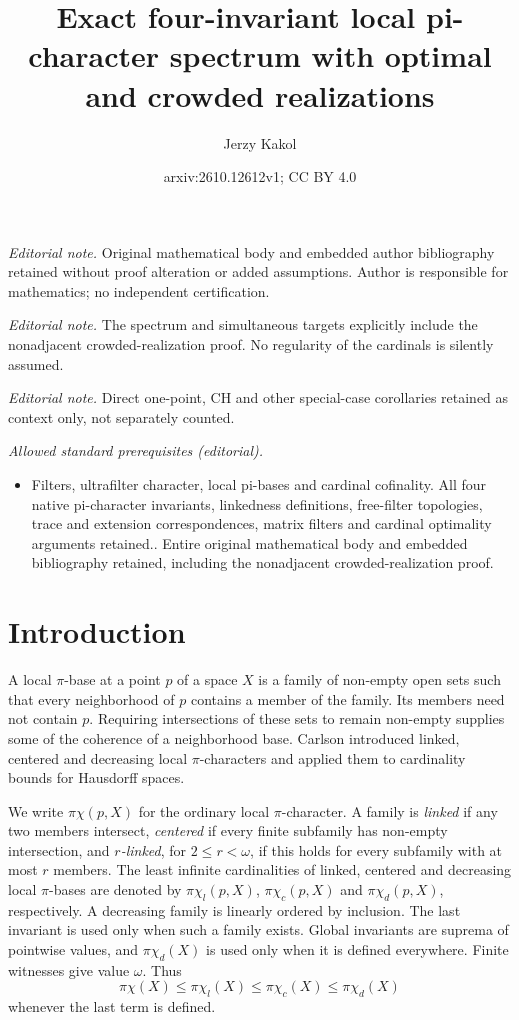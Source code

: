 \documentclass[10pt,a4paper]{amsart}
\title{Exact four-invariant local pi-character spectrum with optimal and crowded realizations}
\author{Jerzy Kakol}
\date{arxiv:2610.12612v1; CC BY 4.0}
\theoremstyle{definition}
\theoremstyle{remark}
\newcommand{\pc}{\pi\chi}
\newcommand{\pcl}{\pi\chi_l}
\newcommand{\pcc}{\pi\chi_c}
\newcommand{\pcd}{\pi\chi_d}
\begin{document}
\maketitle
\noindent\textit{Editorial note.} Original mathematical body and embedded author bibliography retained without proof alteration or added assumptions. Author is responsible for mathematics; no independent certification.\par\medskip
\noindent\textit{Editorial note.} The spectrum and simultaneous targets explicitly include the nonadjacent crowded-realization proof. No regularity of the cardinals is silently assumed.\par\medskip
\noindent\textit{Editorial note.} Direct one-point, CH and other special-case corollaries retained as context only, not separately counted.\par\medskip
\noindent\textit{Allowed standard prerequisites (editorial).}\begin{itemize}
\item Filters, ultrafilter character, local pi-bases and cardinal cofinality. All four native pi-character invariants, linkedness definitions, free-filter topologies, trace and extension correspondences, matrix filters and cardinal optimality arguments retained.. Entire original mathematical body and embedded bibliography retained, including the nonadjacent crowded-realization proof.
\end{itemize}\medskip
\section{Introduction}

A local $\pi$-base at a point $p$ of a space $X$ is a family of non-empty open sets such that every neighborhood of $p$ contains a member of the family. Its members need not contain $p$. Requiring intersections of these sets to remain non-empty supplies some of the coherence of a neighborhood base. Carlson \cite{Carlson} introduced linked, centered and decreasing local $\pi$-characters and applied them to cardinality bounds for Hausdorff spaces.

We write $\pc(p,X)$ for the ordinary local $\pi$-character. A family is \emph{linked} if any two members intersect, \emph{centered} if every finite subfamily has non-empty intersection, and \emph{$r$-linked}, for $2\leqslant r<\omega$, if this holds for every subfamily with at most $r$ members. The least infinite cardinalities of linked, centered and decreasing local $\pi$-bases are denoted by $\pcl(p,X)$, $\pcc(p,X)$ and $\pcd(p,X)$, respectively. A decreasing family is linearly ordered by inclusion. The last invariant is used only when such a family exists. Global invariants are suprema of pointwise values, and $\pcd(X)$ is used only when it is defined everywhere. Finite witnesses give value $\omega$. Thus
\[
\pc(X)\leqslant\pcl(X)\leqslant\pcc(X)\leqslant\pcd(X)
\]
whenever the last term is defined.
\end{document}
